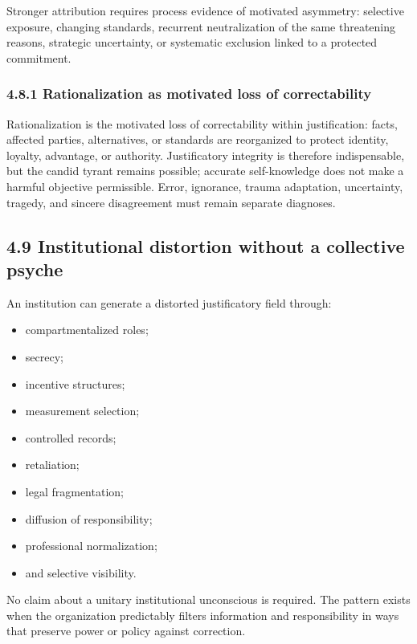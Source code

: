\documentclass[
  11pt,
]{article}
\providecommand{\tightlist}{%
  \setlength{\itemsep}{0pt}\setlength{\parskip}{0pt}}
\begin{document}
Stronger attribution requires process evidence of motivated asymmetry:
selective exposure, changing standards, recurrent neutralization of the
same threatening reasons, strategic uncertainty, or systematic exclusion
linked to a protected commitment.

\subsubsection{4.8.1 Rationalization as motivated loss of
correctability}\label{rationalization-as-motivated-loss-of-correctability}

Rationalization is the motivated loss of correctability within
justification: facts, affected parties, alternatives, or standards are
reorganized to protect identity, loyalty, advantage, or authority.
Justificatory integrity is therefore indispensable, but the candid
tyrant remains possible; accurate self-knowledge does not make a harmful
objective permissible. Error, ignorance, trauma adaptation, uncertainty,
tragedy, and sincere disagreement must remain separate diagnoses.

\subsection{4.9 Institutional distortion without a collective
psyche}\label{institutional-distortion-without-a-collective-psyche}

An institution can generate a distorted justificatory field through:

\begin{itemize}
\tightlist
\item
  compartmentalized roles;
\item
  secrecy;
\item
  incentive structures;
\item
  measurement selection;
\item
  controlled records;
\item
  retaliation;
\item
  legal fragmentation;
\item
  diffusion of responsibility;
\item
  professional normalization;
\item
  and selective visibility.
\end{itemize}

No claim about a unitary institutional unconscious is required. The
pattern exists when the organization predictably filters information and
responsibility in ways that preserve power or policy against correction.
\end{document}
